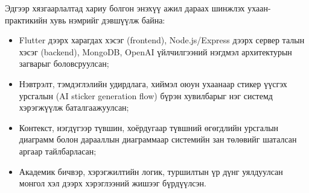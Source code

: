 Эдгээр хязгаарлалтад хариу болгон энэхүү ажил дараах шинжлэх ухаан-практикийн хувь нэмрийг дэвшүүлж байна:

\begin{itemize}
    \item Flutter дээрх харагдах хэсэг (frontend), Node.js/Express дээрх сервер талын хэсэг (backend), MongoDB, OpenAI үйлчилгээний нэгдмэл архитектурын загварыг боловсруулсан;
    \item Нэвтрэлт, тэмдэглэлийн удирдлага, хиймэл оюун ухаанаар стикер үүсгэх урсгалын (AI sticker generation flow) бүрэн хувилбарыг нэг системд хэрэгжүүлж баталгаажуулсан;
    \item Контекст, нэгдүгээр түвшин, хоёрдугаар түвшний өгөгдлийн урсгалын диаграмм болон дарааллын диаграммаар системийн зан төлөвийг шаталсан аргаар тайлбарласан;
    \item Академик бичвэр, хэрэгжилтийн логик, туршилтын үр дүнг уялдуулсан монгол хэл дээрх хэрэглээний жишээг бүрдүүлсэн.
\end{itemize}

